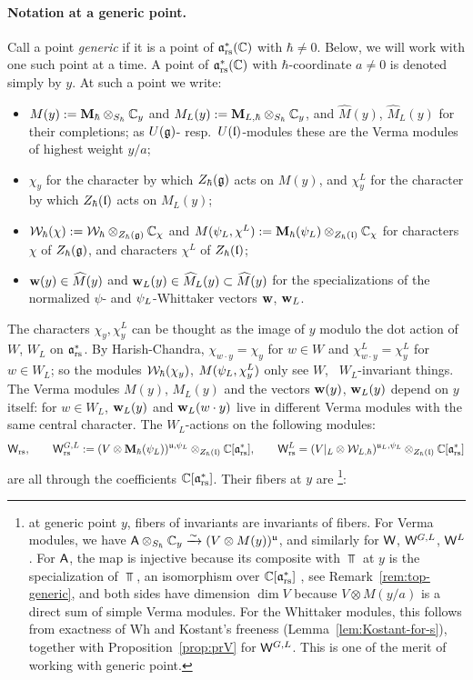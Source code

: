 \documentclass{article}
\theoremstyle{plain}
\theoremstyle{definition}
\theoremstyle{remark}
\numberwithin{equation}{section}
\begin{document}
\paragraph{Notation at a generic point.} Call a point \emph{generic} if it is a point of $\mathfrak{a}^*_{\mathrm{rs}}(\mathbb{C})$ with $\hbar\neq0$.  Below, we will work with one such point at a time. A point of $\mathfrak{a}^*_{\mathrm{rs}}(\mathbb{C})$ with $\hbar$-coordinate $a\neq0$ is denoted simply by $y$. At such a point we write:
\begin{itemize}
\item $M(y):=\mathbf{M}_\hbar\otimes_{S_\hbar}\mathbb{C}_y$ and $M_L(y):=\mathbf{M}_{L,\hbar}\otimes_{S_\hbar}\mathbb{C}_y$, and $\widehat M(y)$, $\widehat M_L(y)$ for their completions; as $U(\mathfrak{g})$- resp.\ $U(\mathfrak{l})$-modules these are the Verma modules of highest weight $y/a$;
\item $\chi_y$ for the character by which $Z_\hbar(\mathfrak{g})$ acts on $M(y)$, and $\chi^L_y$ for the character by which $Z_\hbar(\mathfrak{l})$ acts on $M_L(y)$;
\item $\mathcal{W}_\hbar(\chi):=\mathcal{W}_\hbar\otimes_{Z_\hbar(\mathfrak{g})}\mathbb{C}_\chi$ and $M(\psi_L,\chi^L):=\mathbf{M}_\hbar(\psi_L)\otimes_{Z_\hbar(\mathfrak{l})}\mathbb{C}_\chi$ for characters $\chi$ of $Z_\hbar(\mathfrak{g})$, and characters $\chi^L$ of $Z_\hbar(\mathfrak{l})$;
\item $\mathbf w(y)\in\widehat M(y)$ and $\mathbf w_L(y)\in\widehat M_L(y)\subset\widehat M(y)$ for the specializations of the normalized $\psi$- and $\psi_L$-Whittaker vectors $\mathbf w$, $\mathbf w_L$.
\end{itemize}
The characters $\chi_y,\chi^L_y$ can be thought as the image of $y$ modulo the dot action of $W$, $W_L$ on $\mathfrak{a}^*_{\mathrm{rs}}$. By Harish-Chandra, $\chi_{w\cdot y}=\chi_y$ for $w\in W$ and $\chi^L_{w\cdot y}=\chi^L_y$ for $w\in W_L$; so the modules $\mathcal{W}_\hbar(\chi_y)$,  $M(\psi_L, \chi^L_y)$ only see $W$, \ $W_L$-invariant things. The Verma modules $M(y)$, $M_L(y)$ and the vectors $\mathbf w(y)$, $\mathbf w_L(y)$ depend on $y$ itself: for $w\in W_L$, $\mathbf w_L(y)$ and $\mathbf w_L(w\cdot y)$ live in different Verma modules with the same central character. The $W_L$-actions on the following modules:
\[
\mathsf W_{\mathrm{rs}},\qquad \mathsf W^{G,L}_{\mathrm{rs}}:=(V\otimes\mathbf{M}_\hbar(\psi_L))^{\mathfrak{u},\psi_L}\otimes_{Z_\hbar(\mathfrak{l})}\mathbb{C}[\mathfrak{a}^*_{\mathrm{rs}}],\qquad \mathsf W^L_{\mathrm{rs}}=(V|_L\otimes\mathcal{W}_{L,\hbar})^{\mathfrak{u}_L,\psi_L}\otimes_{Z_\hbar(\mathfrak{l})}\mathbb{C}[\mathfrak{a}^*_{\mathrm{rs}}]
\]
are all through the coefficients $\mathbb{C}[\mathfrak{a}^*_{\mathrm{rs}}]$. Their fibers at $y$ are \footnote{at generic point $y$, fibers of invariants are invariants of fibers. For Verma modules, we have $\mathsf A\otimes_{S_\hbar}\mathbb{C}_y\xrightarrow{\sim}(V\otimes M(y))^{\mathfrak{u}}$, and similarly for $\mathsf W$, $\mathsf W^{G,L}$, $\mathsf W^L$. For $\mathsf A$, the map is injective because its composite with $\Top$ at $y$ is the specialization of $\Top$, an isomorphism over $\mathbb{C}[\mathfrak{a}^*_{\mathrm{rs}}]$ , see Remark~\ref{rem:top-generic}, and both sides have dimension $\dim V$ because $V\otimes M(y/a)$ is a direct sum of simple Verma modules. For the Whittaker modules, this follows from exactness of $\mathrm{Wh}$ and Kostant's freeness (Lemma~\ref{lem:Kostant-for-s}), together with Proposition~\ref{prop:prV} for $\mathsf W^{G,L}$. This is one of the merit of working with generic point.}:
\end{document}
